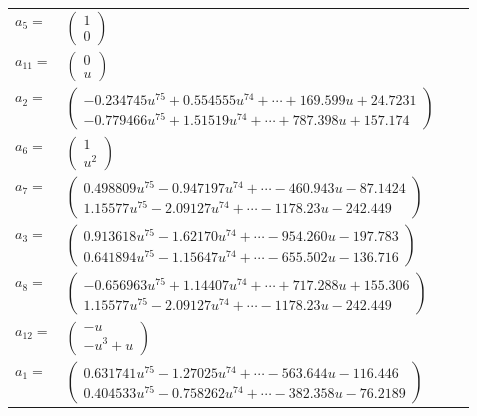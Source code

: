 \documentclass[1p]{elsarticle_modified}
\theoremstyle{definition}
\begin{document}
\begin{tabular}{m{7pt} m{180pt} m{7pt} m{180pt} }
\flushright $a_{5}=$&$\begin{pmatrix}1\\0\end{pmatrix}$ \\
\flushright $a_{11}=$&$\begin{pmatrix}0\\u\end{pmatrix}$ \\
\flushright $a_{2}=$&$\begin{pmatrix}-0.234745 u^{75}+0.554555 u^{74}+\cdots+169.599 u+24.7231\\-0.779466 u^{75}+1.51519 u^{74}+\cdots+787.398 u+157.174\end{pmatrix}$ \\
\flushright $a_{6}=$&$\begin{pmatrix}1\\u^2\end{pmatrix}$ \\
\flushright $a_{7}=$&$\begin{pmatrix}0.498809 u^{75}-0.947197 u^{74}+\cdots-460.943 u-87.1424\\1.15577 u^{75}-2.09127 u^{74}+\cdots-1178.23 u-242.449\end{pmatrix}$ \\
\flushright $a_{3}=$&$\begin{pmatrix}0.913618 u^{75}-1.62170 u^{74}+\cdots-954.260 u-197.783\\0.641894 u^{75}-1.15647 u^{74}+\cdots-655.502 u-136.716\end{pmatrix}$ \\
\flushright $a_{8}=$&$\begin{pmatrix}-0.656963 u^{75}+1.14407 u^{74}+\cdots+717.288 u+155.306\\1.15577 u^{75}-2.09127 u^{74}+\cdots-1178.23 u-242.449\end{pmatrix}$ \\
\flushright $a_{12}=$&$\begin{pmatrix}- u\\- u^3+u\end{pmatrix}$ \\
\flushright $a_{1}=$&$\begin{pmatrix}0.631741 u^{75}-1.27025 u^{74}+\cdots-563.644 u-116.446\\0.404533 u^{75}-0.758262 u^{74}+\cdots-382.358 u-76.2189\end{pmatrix}$ \\

\end{tabular}
\end{document}
